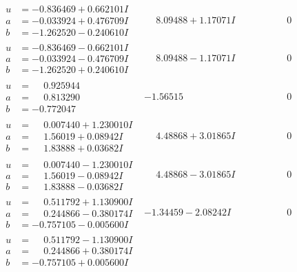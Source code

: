 \documentclass[1p]{elsarticle_modified}
\theoremstyle{definition}
\begin{document}
$$\begin{array}{c|c|c}
\begin{aligned}
u &= -0.836469 + 0.662101 I \\
a &= -0.033924 + 0.476709 I \\
b &= -1.262520 - 0.240610 I\end{aligned}
 & \phantom{-}8.09488 + 1.17071 I & \phantom{-0.000000 } 0 \\ \hline\begin{aligned}
u &= -0.836469 - 0.662101 I \\
a &= -0.033924 - 0.476709 I \\
b &= -1.262520 + 0.240610 I\end{aligned}
 & \phantom{-}8.09488 - 1.17071 I & \phantom{-0.000000 } 0 \\ \hline\begin{aligned}
u &= \phantom{-}0.925944\phantom{ +0.000000I} \\
a &= \phantom{-}0.813290\phantom{ +0.000000I} \\
b &= -0.772047\phantom{ +0.000000I}\end{aligned}
 & -1.56515\phantom{ +0.000000I} & \phantom{-0.000000 } 0 \\ \hline\begin{aligned}
u &= \phantom{-}0.007440 + 1.230010 I \\
a &= \phantom{-}1.56019 + 0.08942 I \\
b &= \phantom{-}1.83888 + 0.03682 I\end{aligned}
 & \phantom{-}4.48868 + 3.01865 I & \phantom{-0.000000 } 0 \\ \hline\begin{aligned}
u &= \phantom{-}0.007440 - 1.230010 I \\
a &= \phantom{-}1.56019 - 0.08942 I \\
b &= \phantom{-}1.83888 - 0.03682 I\end{aligned}
 & \phantom{-}4.48868 - 3.01865 I & \phantom{-0.000000 } 0 \\ \hline\begin{aligned}
u &= \phantom{-}0.511792 + 1.130900 I \\
a &= \phantom{-}0.244866 - 0.380174 I \\
b &= -0.757105 - 0.005600 I\end{aligned}
 & -1.34459 - 2.08242 I & \phantom{-0.000000 } 0 \\ \hline\begin{aligned}
u &= \phantom{-}0.511792 - 1.130900 I \\
a &= \phantom{-}0.244866 + 0.380174 I \\
b &= -0.757105 + 0.005600 I\end{aligned}

\end{array}$$
\end{document}
